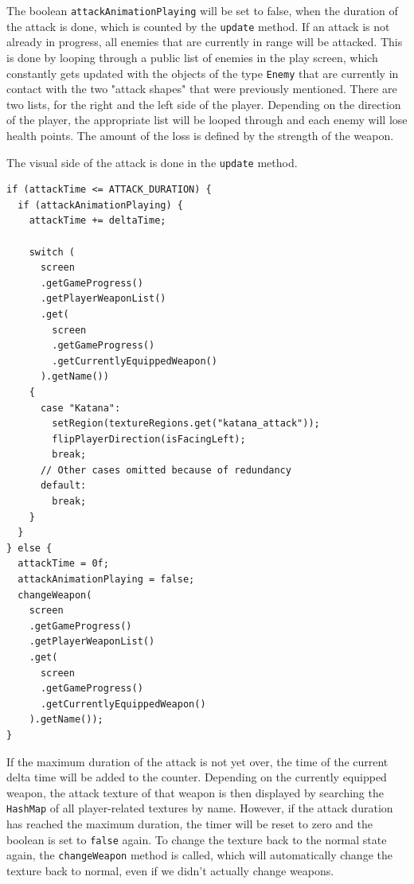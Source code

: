 \documentclass[12p]{article}
\begin{document}
The boolean \texttt{attackAnimationPlaying} will be set to false, when the duration of the attack is done, which is counted by the \texttt{update} method. If an attack is not already in progress, all enemies that are currently in range will be attacked. This is done by looping through a public list of enemies in the play screen, which constantly gets updated with the objects of the type \texttt{Enemy} that are currently in contact with the two "attack shapes" that were previously mentioned. There are two lists, for the right and the left side of the player. Depending on the direction of the player, the appropriate list will be looped through and each enemy will lose health points. The amount of the loss is defined by the strength of the weapon.

The visual side of the attack is done in the \texttt{update} method.

\newpage

\begin{verbatim}
if (attackTime <= ATTACK_DURATION) {
  if (attackAnimationPlaying) {
    attackTime += deltaTime;

    switch (
      screen
      .getGameProgress()
      .getPlayerWeaponList()
      .get(
        screen
        .getGameProgress()
        .getCurrentlyEquippedWeapon()
      ).getName()) 
    {
      case "Katana":
        setRegion(textureRegions.get("katana_attack"));
        flipPlayerDirection(isFacingLeft);
        break;
      // Other cases omitted because of redundancy
      default:
        break;
    }
  }
} else {
  attackTime = 0f;
  attackAnimationPlaying = false;
  changeWeapon(
    screen
    .getGameProgress()
    .getPlayerWeaponList()
    .get(
      screen
      .getGameProgress()
      .getCurrentlyEquippedWeapon()
    ).getName());
}
\end{verbatim}

If the maximum duration of the attack is not yet over, the time of the current delta time will be added to the counter. Depending on the currently equipped weapon, the attack texture of that weapon is then displayed by searching the \texttt{HashMap} of all player-related textures by name. However, if the attack duration has reached the maximum duration, the timer will be reset to zero and the boolean is set to \texttt{false} again. To change the texture back to the normal state again, the \texttt{changeWeapon} method is called, which will automatically change the texture back to normal, even if we didn't actually change weapons.
\end{document}
